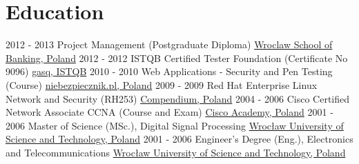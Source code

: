 \documentclass[letterpaper]{tenseconds} %
\begin{document}
\makeprofile %


\section{Education}
\begin{twenty} %
    \twentyitem
        {2012 - 2013}
        {}
        {Project Management \textnormal{(Postgraduate Diploma)}}
        {\href{https://www.wsb.pl/}{Wroclaw School of Banking, Poland}}
        {}
        {}
    \twentyitem
        {2012 - 2012}
        {}
        {ISTQB Certified Tester Foundation \textnormal{(Certificate No 9096)}}
        {\href{https://www.istqb.org/}{gasq, ISTQB}}
        {}
        {}
    \twentyitem
        {2010 - 2010}
        {}
        {Web Applications - Security and Pen Testing \textnormal{(Course)}}
        {\href{https://www.niebezpiecznik.pl/}{niebezpiecznik.pl, Poland}}
        {}
        {}
    \twentyitem
        {2009 - 2009}
        {}
        {Red Hat Enterprise Linux Network and Security \textnormal{(RH253)}}
        {\href{https://www.compendium.pl/}{Compendium, Poland}}
        {}
        {}
    \twentyitem
        {2004 - 2006}
        {}
        {Cisco Certified Network Associate CCNA \textnormal{(Course and Exam)}}
        {\href{https://www.cisco.com/}{Cisco Academy, Poland}}
        {}
        {}
    \twentyitem
        {2001 - 2006}
        {}
        {Master of Science (MSc.), Digital Signal Processing}
        {\href{https://pwr.edu.pl/}{Wrocław University of Science and Technology, Poland}}
        {}
        {}
    \twentyitem
        {2001 - 2006}
        {}
        {Engineer's Degree (Eng.), Electronics and Telecommunications}
        {\href{https://pwr.edu.pl/}{Wrocław University of Science and Technology, Poland}}
        {}
        {}
\end{twenty}
\end{document}
